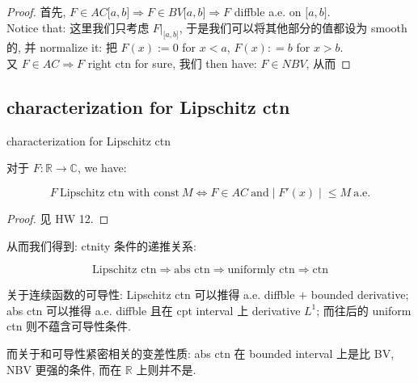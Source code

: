 \documentclass{qlnotes-export}
\begin{document}
\begin{proof}

首先, \(F \in AC\lbrack a,b\rbrack\Longrightarrow F \in BV\lbrack a,b\rbrack\Longrightarrow F\) diffble a.e. on \(\lbrack a,b\rbrack\).\\
Notice that: 这里我们只考虑 \(F|_{\lbrack a,b\rbrack}\), 于是我们可以将其他部分的值都设为 smooth 的, 并 normalize it: 把 \(F(x) := 0\) for \(x < a\), \(F(x): = b\) for \(x > b\).\\
又 \(F \in AC\Longrightarrow F\) right ctn for sure, 我们 then have: \(F \in NBV\), 从而

\end{proof}

\subsection{characterization for Lipschitz ctn}\label{characterization-for-lipschitz-ctn}

\begin{theorem}{characterization for Lipschitz ctn}\label{thm-12-differentiation-on-real-spaces-characterization-for-lipschitz-ctn}

对于 \(F:{\mathbb{R}}\rightarrow{\mathbb{C}}\), we have:

\[\left. F\ \text{Lipschitz ctn with const}\ M\Leftrightarrow F \in AC\ \text{and} \middle| F'(x) \middle| \leq M\ \text{a.e.} \right.\]

\end{theorem}

\begin{proof}

见 HW 12.

\end{proof}

从而我们得到: ctnity 条件的递推关系:

\[\text{Lipschitz ctn}\Longrightarrow\text{abs ctn}\Longrightarrow\text{uniformly ctn}\Longrightarrow\text{ctn}\]

关于连续函数的可导性: Lipschitz ctn 可以推得 a.e. diffble \(+\) bounded derivative; abs ctn 可以推得 a.e. diffble 且在 cpt interval 上 derivative \(L^{1}\); 而往后的 uniform ctn 则不蕴含可导性条件.

而关于和可导性紧密相关的变差性质: abs ctn 在 bounded interval 上是比 BV, NBV 更强的条件, 而在 \(\mathbb{R}\) 上则并不是.
\end{document}
